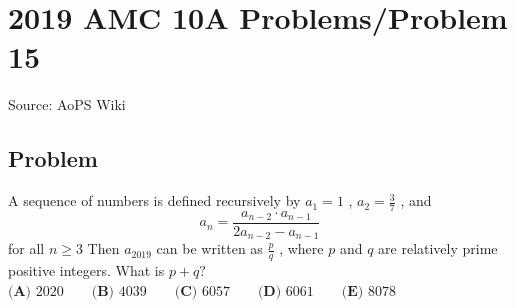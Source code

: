 \documentclass[12pt]{article}
\begin{document}
\section*{{2019 AMC 10A Problems/Problem 15}}
Source: AoPS Wiki

\subsection*{Problem}
A sequence of numbers is defined recursively by $a_1 = 1$ , $a_2 = \frac{3}{7}$ , and \[a_n=\frac{a_{n-2} \cdot a_{n-1}}{2a_{n-2} - a_{n-1}}\] for all $n \geq 3$ Then $a_{2019}$ can be written as $\frac{p}{q}$ , where $p$ and $q$ are relatively prime positive integers. What is $p+q ?$ $\textbf{(A) } 2020 \qquad\textbf{(B) } 4039 \qquad\textbf{(C) } 6057 \qquad\textbf{(D) } 6061 \qquad\textbf{(E) } 8078$
\end{document}
